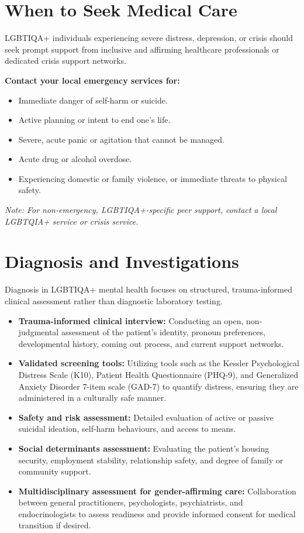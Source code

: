 \section*{When to Seek Medical Care}
LGBTIQA+ individuals experiencing severe distress, depression, or crisis should seek prompt support from inclusive and affirming healthcare professionals or dedicated crisis support networks.

\textbf{Contact your local emergency services for:}
\begin{itemize}
    \item Immediate danger of self-harm or suicide.
    \item Active planning or intent to end one's life.
    \item Severe, acute panic or agitation that cannot be managed.
    \item Acute drug or alcohol overdose.
    \item Experiencing domestic or family violence, or immediate threats to physical safety.
\end{itemize}
\textit{Note: For non-emergency, LGBTIQA+-specific peer support, contact a local LGBTQIA+ service or crisis service.}

\section*{Diagnosis and Investigations}
Diagnosis in LGBTIQA+ mental health focuses on structured, trauma-informed clinical assessment rather than diagnostic laboratory testing.
\begin{itemize}
    \item \textbf{Trauma-informed clinical interview:} Conducting an open, non-judgmental assessment of the patient's identity, pronoun preferences, developmental history, coming out process, and current support networks.
    \item \textbf{Validated screening tools:} Utilizing tools such as the Kessler Psychological Distress Scale (K10), Patient Health Questionnaire (PHQ-9), and Generalized Anxiety Disorder 7-item scale (GAD-7) to quantify distress, ensuring they are administered in a culturally safe manner.
    \item \textbf{Safety and risk assessment:} Detailed evaluation of active or passive suicidal ideation, self-harm behaviours, and access to means.
    \item \textbf{Social determinants assessment:} Evaluating the patient's housing security, employment stability, relationship safety, and degree of family or community support.
    \item \textbf{Multidisciplinary assessment for gender-affirming care:} Collaboration between general practitioners, psychologists, psychiatrists, and endocrinologists to assess readiness and provide informed consent for medical transition if desired.
\end{itemize}

